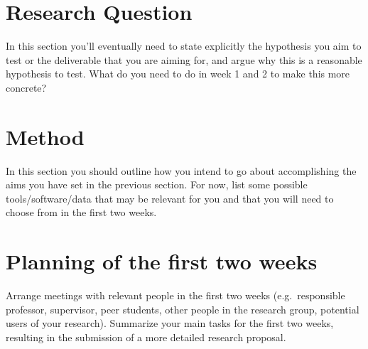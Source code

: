 \documentclass[english, a4paper, 11pt]{article}
\begin{document}
\section*{Research Question}

In this section you'll eventually need to state explicitly the hypothesis you aim to test or the deliverable that you are aiming for, and argue why this is a reasonable hypothesis to test.
What do you need to do in week 1 and 2 to make this more concrete?


\section*{Method}
In this section you should outline how you intend to go about accomplishing the aims you have set in the previous section. 
For now, list some possible tools/software/data that may be relevant for you and that you will need to choose from in the first two weeks.


\section*{Planning of the first two weeks}
Arrange meetings with relevant people in the first two weeks (e.g.\ responsible professor, supervisor, peer students, other people in the research group, potential users of your research).
Summarize your main tasks for the first two weeks, resulting in the submission of a more detailed research proposal.

\printbibliography
\end{document}
